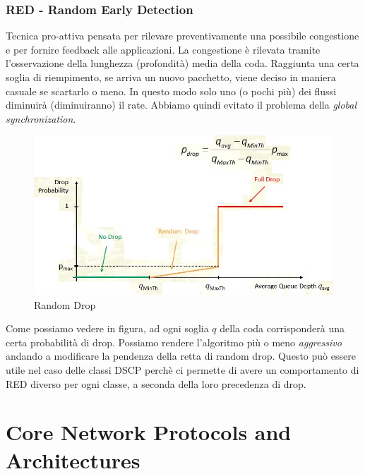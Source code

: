 \documentclass{article}
\begin{document}
\subsubsection{RED - Random Early Detection}
Tecnica pro-attiva pensata per rilevare preventivamente una possibile congestione e per fornire feedback alle applicazioni. La congestione è rilevata tramite l'osservazione della lunghezza (profondità) media della coda. Raggiunta una certa soglia di riempimento, se arriva un nuovo pacchetto, viene deciso in maniera casuale se scartarlo o meno. In questo modo solo uno (o pochi più) dei flussi diminuirà (diminuiranno) il rate. Abbiamo quindi evitato il problema della \textit{global synchronization}.

\begin{figure}[H]
    \centering
    \includegraphics[scale=0.5]{figures/red.jpg}
    \caption{Random Drop}
\end{figure}
\noindent Come possiamo vedere in figura, ad ogni soglia \(q\) della coda corrisponderà una certa probabilità di drop. Possiamo rendere l'algoritmo più o meno \textit{aggressivo} andando a modificare la pendenza della retta di random drop. Questo può essere utile nel caso delle classi DSCP perchè ci permette di avere un comportamento di RED diverso per ogni classe, a seconda della loro precedenza di drop.

\newpage
\section{Core Network Protocols and Architectures}
\end{document}
